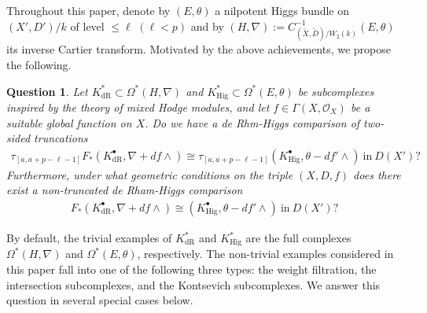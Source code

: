 \documentclass[12pt, a4paper]{article}
\newtheorem{question}{Question}[section]
\begin{document}
Throughout this paper, denote by $(E,\theta)$ a nilpotent Higgs bundle on $(X',D')/k$ of level $\leq\ell$ $(\ell<p)$ and by $(H,\nabla):=C^{-1}_{(\tilde X,\tilde D)/W_2(k)}(E,\theta)$ its inverse Cartier transform. Motivated by the above achievements, we propose the following.

\begin{question}\label{Question 1}
Let $K^*_\mathrm{dR}\subset\Omega^*(H,\nabla)$ and $K^*_\mathrm{Hig}\subset\Omega^*(E,\theta)$ be subcomplexes inspired by the theory of mixed Hodge modules, and let $f\in\Gamma(X,\mathcal O_X)$ be a suitable global function on $X$. Do we have a de Rhm-Higgs comparison of two-sided truncations
\begin{eqnarray}\label{de-H com for MHM}
\tau_{[a,a+p-\ell-1]}F_*(K^\bullet_\mathrm{dR},\nabla+df\wedge)\cong\tau_{[a,a+p-\ell-1]}(K^\bullet_\mathrm{Hig},\theta-df'\wedge)~\mathrm{in}~D(X')?
\end{eqnarray}
Furthermore, under what geometric conditions on the triple \( (X, D, f) \) does there exist a non-truncated de Rham-Higgs comparison
\begin{eqnarray}\label{de-H com for MHM non-truncated}
F_*(K^\bullet_\mathrm{dR},\nabla+df\wedge)\cong(K^\bullet_\mathrm{Hig},\theta-df'\wedge)~\mathrm{in}~D(X')?
\end{eqnarray}
\end{question}
By default, the trivial examples of $K_{\mathrm{dR}}^*$ and $K^*_\mathrm{Hig}$ are the full complexes $\Omega^*(H,\nabla)$ and $\Omega^*(E,\theta)$, respectively. The non-trivial examples considered in this paper fall into one of the following three types: the weight filtration, the intersection subcomplexes, and the Kontsevich subcomplexes. We answer this question in several special cases below.
\end{document}
